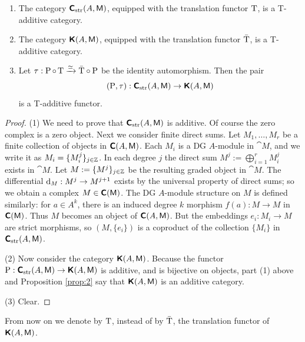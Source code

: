 \begin{prop} \label{prop:1416} 
\mbox{}
\begin{enumerate}
\item The category $\boldsymbol{\mathsf{C}}_{\mathrm{str}}(A, \operatorname{\mathsf{M}})$,
equipped with the translation functor $\operatorname{T}$, is a T-additive category. 

\item The category $\boldsymbol{\mathsf{K}}(A, \operatorname{\mathsf{M}})$,
equipped with the translation functor $\bar{\operatorname{T}}$, is a T-additive 
category. 

\item Let $\tau : \operatorname{P} \circ \operatorname{T} \xrightarrow{\simeq} \bar{\operatorname{T}} \circ \operatorname{P}$
be the identity automorphism. Then the pair 
\[ (\operatorname{P}, \tau) : \boldsymbol{\mathsf{C}}_{\mathrm{str}}(A, \operatorname{\mathsf{M}}) \to \boldsymbol{\mathsf{K}}(A, \operatorname{\mathsf{M}}) 
\]
is a T-additive functor.
\end{enumerate}
\end{prop}

\begin{proof}
(1) We need to prove that $\boldsymbol{\mathsf{C}}_{\mathrm{str}}(A, \operatorname{\mathsf{M}})$
is additive. Of course the zero complex is a zero object. 
Next we consider finite direct sums. 
Let $M_1, \ldots, M_r$ be a finite collection of objects in 
$\boldsymbol{\mathsf{C}}(A, \operatorname{\mathsf{M}})$. Each $M_i$ is a DG $A$-module in $\cat{M}$, and we 
write it as $M_i = \{ M_i^j \}_{j \in \mathbb{Z}}$. 
In each degree $j$ the direct sum 
$M^j := \bigoplus_{i = 1}^r M^j_i$ 
exists in $\cat{M}$. Let $M := \{ M^j \}_{j \in \mathbb{Z}}$ be the resulting graded 
object in $\cat{M}$. The differential $\mathrm{d}_M : M^j \to M^{j + 1}$ exists 
by the universal property of direct sums; so we obtain a complex 
$M \in \boldsymbol{\mathsf{C}}(\operatorname{\mathsf{M}})$. 
The DG $A$-module structure on $M$ is defined 
similarly: for $a \in A^k$, there is an induced degree $k$ morphism 
$f(a) : M \to M$ in $\boldsymbol{\mathsf{C}}(\operatorname{\mathsf{M}})$. Thus $M$ becomes an object of
$\boldsymbol{\mathsf{C}}(A, \operatorname{\mathsf{M}})$. But the embeddings $e_i : M_i \to M$ are strict 
morphisms, so $(M, \{ e_i \})$ is a coproduct of the collection $\{ M_i \}$ 
in $\boldsymbol{\mathsf{C}}_{\mathrm{str}}(A, \operatorname{\mathsf{M}})$.

\medskip \noindent 
(2) Now consider the category $\boldsymbol{\mathsf{K}}(A, \operatorname{\mathsf{M}})$.
Because the functor 
$\operatorname{P} : \boldsymbol{\mathsf{C}}_{\mathrm{str}}(A, \operatorname{\mathsf{M}}) \to \boldsymbol{\mathsf{K}}(A, \operatorname{\mathsf{M}})$
is additive, and is bijective on objects, part (1) above and Proposition 
\ref{prop:2} say that $\boldsymbol{\mathsf{K}}(A, \operatorname{\mathsf{M}})$ is an additive category. 

\medskip \noindent 
(3) Clear. 
\end{proof}

From now on  we  denote by $\operatorname{T}$, instead of by $\bar{\operatorname{T}}$, the 
translation functor of $\boldsymbol{\mathsf{K}}(A, \operatorname{\mathsf{M}})$. 



